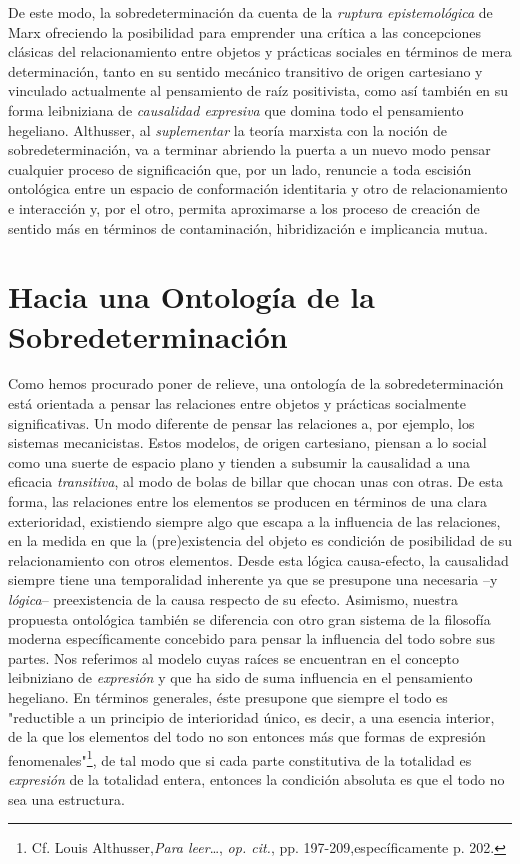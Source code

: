 De este modo, la sobredeterminación da cuenta de la \emph{ruptura
epistemológica} de Marx ofreciendo la posibilidad para emprender una
crítica a las concepciones clásicas del relacionamiento entre objetos y
prácticas sociales en términos de mera determinación, tanto en su
sentido mecánico transitivo de origen cartesiano y vinculado actualmente
al pensamiento de raíz positivista, como así también en su forma
leibniziana de \emph{causalidad expresiva} que domina todo el
pensamiento hegeliano. Althusser, al \emph{suplementar} la teoría
marxista con la noción de sobredeterminación, va a terminar abriendo la
puerta a un nuevo modo pensar cualquier proceso de significación que,
por un lado, renuncie a toda escisión ontológica entre un espacio de
conformación identitaria y otro de relacionamiento e interacción y, por
el otro, permita aproximarse a los proceso de creación de sentido más en
términos de contaminación, hibridización e implicancia mutua.

\hypertarget{hacia-una-ontologuxeda-de-la-sobredeterminaciuxf3n}{%
\section{Hacia una Ontología de la Sobredeterminación}\label{hacia-una-ontologuxeda-de-la-sobredeterminaciuxf3n}}

Como hemos procurado poner de relieve, una ontología de la
sobredeterminación está orientada a pensar las relaciones entre objetos
y prácticas socialmente significativas. Un modo diferente de pensar las
relaciones a, por ejemplo, los sistemas mecanicistas. Estos modelos, de
origen cartesiano, piensan a lo social como una suerte de espacio plano
y tienden a subsumir la causalidad a una eficacia \emph{transitiva}, al
modo de bolas de billar que chocan unas con otras. De esta forma, las
relaciones entre los elementos se producen en términos de una clara
exterioridad, existiendo siempre algo que escapa a la influencia de las
relaciones, en la medida en que la (pre)existencia del objeto es
condición de posibilidad de su relacionamiento con otros elementos.
Desde esta lógica causa-efecto, la causalidad siempre tiene una
temporalidad inherente ya que se presupone una necesaria --y
\emph{lógica}-- preexistencia de la causa respecto de su efecto.
Asimismo, nuestra propuesta ontológica también se diferencia con otro
gran sistema de la filosofía moderna específicamente concebido para
pensar la influencia del todo sobre sus partes. Nos referimos al modelo
cuyas raíces se encuentran en el concepto leibniziano de
\emph{expresión} y que ha sido de suma influencia en el pensamiento
hegeliano. En términos generales, éste presupone que siempre el todo es
"reductible a un principio de interioridad único, es decir, a una
esencia interior, de la que los elementos del todo no son entonces más
que formas de expresión fenomenales"\footnote{Cf. Louis
  Althusser,\emph{Para leer}\ldots, \emph{op. cit.}, pp.
  197-209,específicamente p. 202.}, de tal modo que si cada parte
constitutiva de la totalidad es \emph{expresión} de la totalidad entera,
entonces la condición absoluta es que el todo no sea una estructura.

